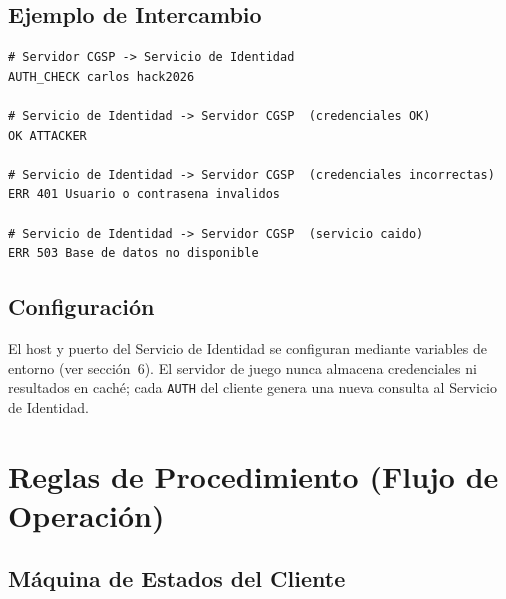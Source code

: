 \documentclass[12pt, letterpaper]{article}
\begin{document}
\subsection{Ejemplo de Intercambio}

\begin{lstlisting}
# Servidor CGSP -> Servicio de Identidad
AUTH_CHECK carlos hack2026

# Servicio de Identidad -> Servidor CGSP  (credenciales OK)
OK ATTACKER

# Servicio de Identidad -> Servidor CGSP  (credenciales incorrectas)
ERR 401 Usuario o contrasena invalidos

# Servicio de Identidad -> Servidor CGSP  (servicio caido)
ERR 503 Base de datos no disponible
\end{lstlisting}

\subsection{Configuración}

El host y puerto del Servicio de Identidad se configuran mediante variables de
entorno (ver sección~6). El servidor de juego nunca almacena credenciales ni resultados
en caché; cada \texttt{AUTH} del cliente genera una nueva consulta al Servicio de
Identidad.

\section{Reglas de Procedimiento (Flujo de Operación)}

\subsection{Máquina de Estados del Cliente}
\end{document}
